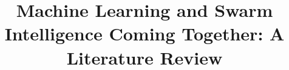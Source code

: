 \documentclass[twocolumn]{bmcart}%
\begin{document}
\begin{frontmatter}

\begin{fmbox}



\title{Machine Learning and Swarm Intelligence Coming Together: A Literature Review  }


\author[
   addressref={aff1},
   email={cdsalcedo@mun.ca}
]{ }

\author[
   addressref={aff1},                   %
   email={dsibrahim@mun.ca}   %
]{ }

\address[id=aff1]{%
  , %
  ,                     %
  ,                              %
}



\end{fmbox}
\end{frontmatter}
\end{document}
